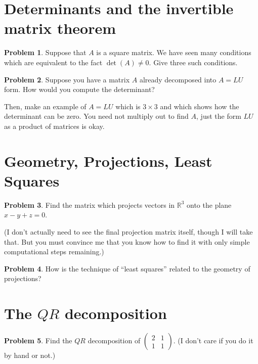 \documentclass[11pt]{amsart}
\theoremstyle{definition}
\newtheorem{problem}{Problem}[section]
\begin{document}
\pagebreak

\section{Determinants and the invertible matrix theorem}

\begin{problem}
Suppose that $A$ is a square matrix. We have seen many conditions which are equivalent to the fact $\det(A) \neq 0$. Give three such conditions.
\end{problem}

\begin{problem}
Suppose you have a matrix $A$ already decomposed into $A = LU$ form. How would you compute the determinant?

Then, make an example of $A= LU$ which is $3\times 3$ and which shows how the determinant can be zero. You need not multiply out to find $A$, just the form $LU$ as a product of matrices is okay.
\end{problem}


\vspace{1cm}
\section{Geometry, Projections, Least Squares}

\begin{problem}
Find the matrix which projects vectors in $\mathbb{R}^3$ onto the plane $x - y + z = 0$.

(I don't actually need to see the final projection matrix itself, though I will take that. But you must convince me that you know how to find it with only simple computational steps remaining.)
\end{problem}

\begin{problem}
How is the technique of ``least squares'' related to the geometry of projections?
\end{problem}

\vspace{1cm}
\section{The $QR$ decomposition}

\begin{problem}
Find the $QR$ decomposition of $\left( \begin{smallmatrix} 2 & 1 \\ 1 & 1 \end{smallmatrix}\right)$. (I don't care if you do it by hand or not.)
\end{problem}
\end{document}
